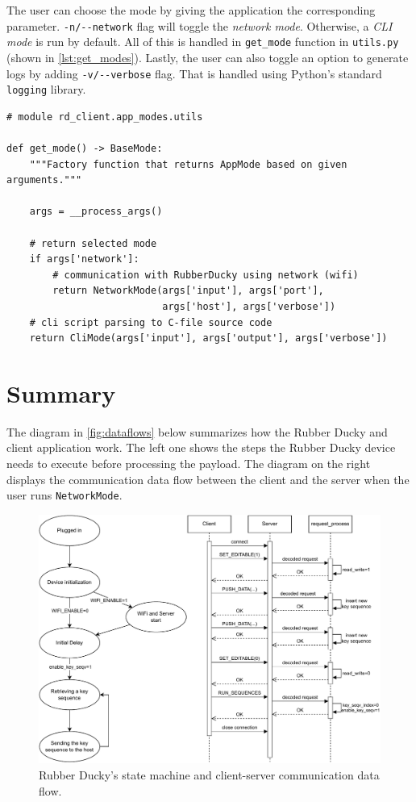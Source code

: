 The user can choose the mode by giving the application the corresponding parameter. \verb|-n/--network| flag will toggle the \emph{network mode}. Otherwise, a \emph{CLI mode} is run by default. All of this is handled in \verb|get_mode| function in \verb|utils.py| (shown in \autoref{lst:get_modes}). Lastly, the user can also toggle an option to generate logs by adding \verb|-v/--verbose| flag. That is handled using Python's standard \verb|logging| library.

\begin{lstlisting}
# module rd_client.app_modes.utils

def get_mode() -> BaseMode:
    """Factory function that returns AppMode based on given arguments."""

    args = __process_args()

    # return selected mode
    if args['network']:
        # communication with RubberDucky using network (wifi)
        return NetworkMode(args['input'], args['port'],
                           args['host'], args['verbose'])
    # cli script parsing to C-file source code
    return CliMode(args['input'], args['output'], args['verbose'])
\end{lstlisting}

\section{Summary}
The diagram in \autoref{fig:dataflows} below summarizes how the Rubber Ducky and client application work. The left one shows the steps the Rubber Ducky device needs to execute before processing the payload. The diagram on the right displays the communication data flow between the client and the server when the user runs \verb|NetworkMode|.
\begin{figure}[ht]
    \centering
    \includegraphics[width=0.9\linewidth]{obrazky-figures/summary_diagram.pdf}
    \caption{Rubber Ducky's state machine and client-server communication data flow.}
    \label{fig:dataflows}
\end{figure}

